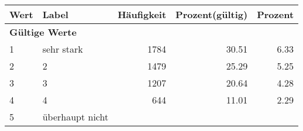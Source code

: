     \begin{longtable}{lXrrr}
     \toprule
     \textbf{Wert} & \textbf{Label} & \textbf{Häufigkeit} & \textbf{Prozent(gültig)} & \textbf{Prozent} \\
     \endhead
     \midrule
     \multicolumn{5}{l}{\textbf{Gültige Werte}}\\

     1 &
     \multicolumn{1}{X}{ sehr stark   } &


       \num{1784} &
       \num[round-mode=places,round-precision=2]{30.51} &
         \num[round-mode=places,round-precision=2]{6.33} \\

     2 &
     \multicolumn{1}{X}{ 2   } &


       \num{1479} &
       \num[round-mode=places,round-precision=2]{25.29} &
         \num[round-mode=places,round-precision=2]{5.25} \\

     3 &
     \multicolumn{1}{X}{ 3   } &


       \num{1207} &
       \num[round-mode=places,round-precision=2]{20.64} &
         \num[round-mode=places,round-precision=2]{4.28} \\

     4 &
     \multicolumn{1}{X}{ 4   } &


       \num{644} &
       \num[round-mode=places,round-precision=2]{11.01} &
         \num[round-mode=places,round-precision=2]{2.29} \\

     5 &
     \multicolumn{1}{X}{ überhaupt nicht   } &



\end{longtable}
